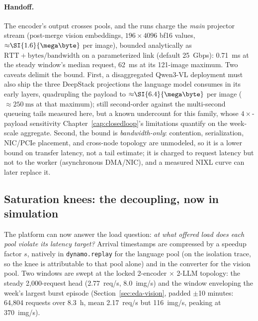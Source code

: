 \paragraph{Handoff.} The encoder's output crosses pools, and the runs charge
the \emph{main} projector stream (post-merge vision embeddings, $196 \times
4096$ bf16 values, ${\approx}\SI{1.6}{\mega\byte}$ per image), bounded
analytically as $\text{RTT} + \text{bytes}/\text{bandwidth}$ on a
parameterized link (default \SI{25}{Gbps}): \SI{0.71}{\milli\second} at the
steady window's median request, \SI{62}{\milli\second} at its 121-image
maximum. Two caveats delimit the bound. First, a disaggregated Qwen3-VL
deployment must also ship the three DeepStack projections the language model
consumes in its early layers, quadrupling the payload to
${\approx}\SI{6.4}{\mega\byte}$ per image
(${\approx}\SI{250}{\milli\second}$ at that maximum); still second-order
against the multi-second queueing tails measured here, but a known
undercount for this family, whose $4\times$-payload sensitivity
Chapter~\ref{cap:closedloop}'s limitations quantify on the week-scale
aggregate. Second, the bound is \emph{bandwidth-only}: contention,
serialization, NIC/PCIe placement, and cross-node topology are unmodeled,
so it is a lower bound on transfer latency, not a tail estimate; it is
charged to request latency but not to the worker (asynchronous DMA/NIC), and
a measured NIXL curve can later replace it.

\subsection{Saturation knees: the decoupling, now in simulation}
\label{sec:sim-knees}

The platform can now answer the load question: \emph{at what offered load
does each pool violate its latency target?} Arrival timestamps are
compressed by a speedup factor $s$, natively in \texttt{dynamo.replay} for
the language pool (on the isolation trace, so the knee is attributable to
that pool alone) and in the converter for the vision pool. Two windows are swept at the
locked 2-encoder $\times$ 2-LLM topology: the steady 2{,}000-request head
(\SI{2.77}{req/s}, \SI{8.0}{img/s}) and the window enveloping the week's
largest burst episode (Section~\ref{sec:eda-vision}, padded $\pm$10 minutes:
64{,}804 requests over \SI{8.3}{\hour}, mean \SI{2.17}{req/s} but
\SI{116}{img/s}, peaking at \SI{370}{img/s}).

